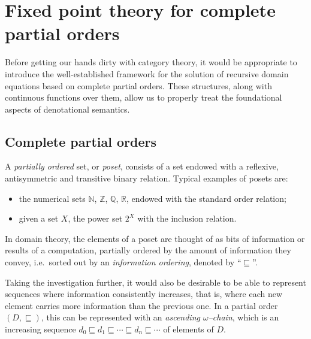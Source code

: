 \section[Fixed point theory for cpos]%
{Fixed point theory for complete partial orders}\label{sec-1}

Before getting our hands dirty with category theory, it would be appropriate to
introduce the well-established framework for the solution of recursive domain
equations based on complete partial orders.
These structures, along with continuous functions over them, allow us to properly treat the foundational aspects of denotational semantics.

\subsection[Complete partial orders]{Complete partial orders}

A \emph{partially ordered} set, or \emph{poset}, consists of a set endowed with a reflexive, antisymmetric and transitive binary relation.
Typical examples of posets are:
\begin{itemize}
  \item the numerical sets \(\mathbb{N}\), \(\mathbb{Z}\), \(\mathbb{Q}\), \(\mathbb{R}\), endowed with the standard order relation;
  \item given a set \(X\), the power set \(2^X\) with the inclusion relation.
\end{itemize}
In domain theory, the elements of a poset are thought of as bits of information or results of a computation, partially ordered by the amount of information they convey, i.e.\ sorted out by an \emph{information ordering}, denoted by ``\(\sqsubseteq\)''. %

Taking the investigation further, it would also be desirable to be able to represent sequences where information consistently increases, that is, where each new element carries more information than the previous one.
In a partial order \((D, {}\sqsubseteq)\), this can be represented with an
\emph{ascending \(\omega\)--chain}, which is an increasing sequence %
\(d_0 \sqsubseteq d_1 \sqsubseteq \dotsb \sqsubseteq d_n \sqsubseteq \dotsb{}\) of elements of \(D\).

